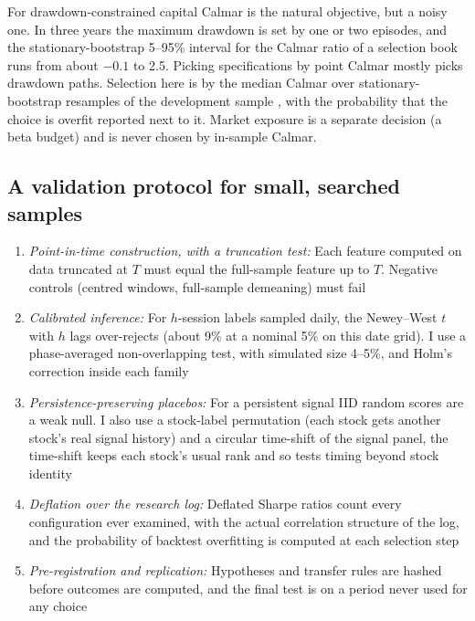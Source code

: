 For drawdown-constrained capital Calmar is the natural objective, but a noisy one. In three years the maximum drawdown is set by one or two episodes, and the stationary-bootstrap 5--95\% interval for the Calmar ratio of a selection book runs from about $-0.1$ to 2.5. Picking specifications by point Calmar mostly picks drawdown paths. Selection here is by the median Calmar over stationary-bootstrap resamples of the development sample \citep{politis1994}, with the probability that the choice is overfit reported next to it. Market exposure is a separate decision (a beta budget) and is never chosen by in-sample Calmar.

\subsection{A validation protocol for small, searched samples}
\begin{enumerate}
  \item \emph{Point-in-time construction, with a truncation test:} Each feature computed on data truncated at $T$ must equal the full-sample feature up to $T$. Negative controls (centred windows, full-sample demeaning) must fail
  \item \emph{Calibrated inference:} For $h$-session labels sampled daily, the Newey--West $t$ with $h$ lags over-rejects (about 9\% at a nominal 5\% on this date grid). I use a phase-averaged non-overlapping test, with simulated size 4--5\%, and Holm's correction inside each family
  \item \emph{Persistence-preserving placebos:} For a persistent signal IID random scores are a weak null. I also use a stock-label permutation (each stock gets another stock's real signal history) and a circular time-shift of the signal panel, the time-shift keeps each stock's usual rank and so tests timing beyond stock identity
  \item \emph{Deflation over the research log:} Deflated Sharpe ratios count every configuration ever examined, with the actual correlation structure of the log, and the probability of backtest overfitting is computed at each selection step
  \item \emph{Pre-registration and replication:} Hypotheses and transfer rules are hashed before outcomes are computed, and the final test is on a period never used for any choice
\end{enumerate}
